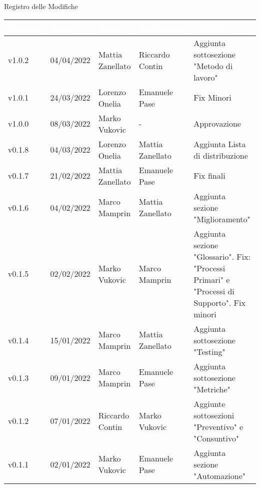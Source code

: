 \begin{center}
  \huge{Registro delle Modifiche}
\end{center}

\renewcommand\arraystretch{1,5}
{\centering
\begin{longtable}{|C{1.8cm}|C{2.1cm}|C{2cm}|C{2.4cm}|L{4.4cm}|}
  \hline
  \textcolor[HTML]{FFFFFF}{\textbf{Versione}} & \textcolor[HTML]{FFFFFF}{\textbf{Data}} & \textcolor[HTML]{FFFFFF}{\textbf{Autore}}  & \textcolor[HTML]{FFFFFF}{\textbf{Verificatore}} & \textcolor[HTML]{FFFFFF}{\textbf{Modifica}}    \\ \hline
  v1.0.2     & 04/04/2022    & Mattia Zanellato & Riccardo Contin    & Aggiunta sottosezione "Metodo di lavoro"               \\ \hline
  v1.0.1     & 24/03/2022    & Lorenzo Onelia   & Emanuele Pase    & Fix Minori                \\ \hline
  v1.0.0     & 08/03/2022    & Marko Vukovic    & - & Approvazione     \\ \hline
  v0.1.8     & 04/03/2022    & Lorenzo Onelia   & Mattia Zanellato     & Aggiunta Lista di distribuzione                  \\ \hline
  v0.1.7     & 21/02/2022    & Mattia Zanellato & Emanuele Pase         & Fix finali   \\ \hline
  v0.1.6     & 04/02/2022    & Marco Mamprin    & Mattia Zanellato      & Aggiunta sezione "Miglioramento"   \\ \hline
  v0.1.5     & 02/02/2022    & Marko Vukovic    & Marco Mamprin         & Aggiunta sezione "Glossario". Fix: "Processi Primari" e "Processi di Supporto". Fix minori   \\ \hline
  v0.1.4     & 15/01/2022    & Marco Mamprin    & Mattia Zanellato      & Aggiunta sottosezione "Testing"  \\ \hline
  v0.1.3     & 09/01/2022    & Marco Mamprin    & Emanuele Pase         & Aggiunta sottosezione "Metriche"  \\ \hline
  v0.1.2     & 07/01/2022    & Riccardo Contin  & Marko Vukovic         & Aggiunte sottosezioni "Preventivo" e "Consuntivo"  \\ \hline
  v0.1.1     & 02/01/2022    & Marko Vukovic    & Emanuele Pase         & Aggiunta sezione "Automazione"  \\ \hline

\end{longtable}}
